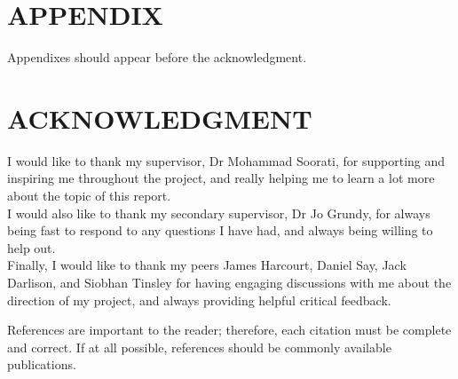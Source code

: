 \documentclass[letterpaper, 10 pt, conference]{ieeeconf}  %
\begin{document}
\addtolength{\textheight}{-12cm}   %







\section*{APPENDIX}

Appendixes should appear before the acknowledgment.

\section*{ACKNOWLEDGMENT}

I would like to thank my supervisor, Dr Mohammad Soorati, for supporting and inspiring me throughout the project, and really helping me to learn a lot more about the topic of this report.\\

I would also like to thank my secondary supervisor, Dr Jo Grundy, for always being fast to respond to any questions I have had, and always being willing to help out.\\

Finally, I would like to thank my peers James Harcourt, Daniel Say, Jack Darlison, and Siobhan Tinsley for having engaging discussions with me about the direction of my project, and always providing helpful critical feedback.




References are important to the reader; therefore, each citation must be complete and correct. If at all possible, references should be commonly available publications.




{}
\end{document}
